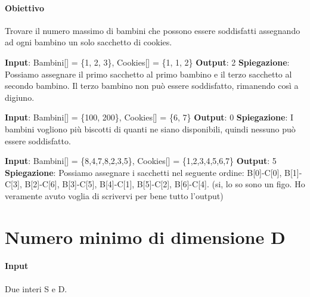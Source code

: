     \paragraph{Obiettivo} Trovare il numero massimo di bambini che possono essere soddisfatti assegnando ad ogni bambino un solo sacchetto di cookies.
    \begin{esempio}
        \newline
        \textbf{Input}: Bambini[] = \{1, 2, 3\}, Cookies[] = \{1, 1, 2\}
        \newline
        \textbf{Output}: 2
        \newline
        \textbf{Spiegazione}: Possiamo assegnare il primo sacchetto al primo bambino e il terzo sacchetto al secondo bambino. Il terzo bambino non può essere soddisfatto, rimanendo così a digiuno.
    \end{esempio}
    \begin{esempio}
        \newline
        \textbf{Input}: Bambini[] = \{100, 200\}, Cookies[] = \{6, 7\}
        \newline
        \textbf{Output}: 0
        \newline
        \textbf{Spiegazione}: I bambini vogliono più biscotti di quanti ne siano disponibili, quindi nessuno può essere soddisfatto.
    \end{esempio}
    \begin{esempio}
        \newline
        \textbf{Input}: Bambini[] = \{8,4,7,8,2,3,5\}, Cookies[] = \{1,2,3,4,5,6,7\}
        \newline
        \textbf{Output}: 5
        \newline
        \textbf{Spiegazione}: Possiamo assegnare i sacchetti nel seguente ordine: B[0]-C[0], B[1]-C[3], B[2]-C[6], B[3]-C[5], B[4]-C[1], B[5]-C[2], B[6]-C[4]. \newline (si, lo so sono un figo. Ho veramente avuto voglia di scrivervi per bene tutto l'output)
    \end{esempio}

\newpage
\thispagestyle{chapterInit}
\section*{Numero minimo di dimensione D}
    \paragraph{Input} Due interi S e D.
